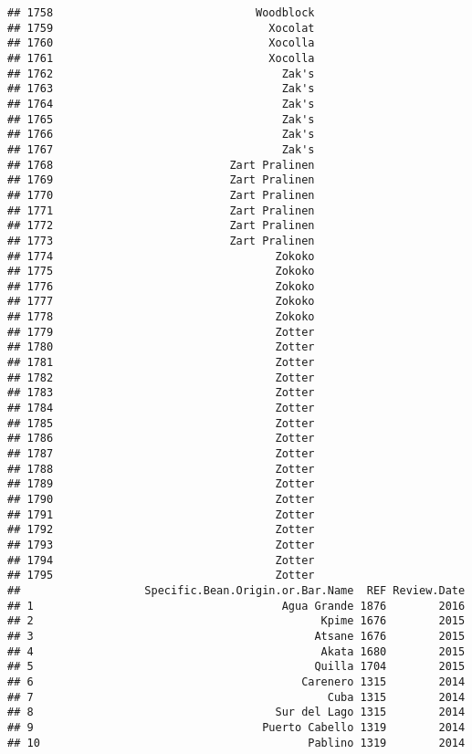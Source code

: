 \documentclass[
]{article}
\begin{document}
\begin{verbatim}
## 1758                               Woodblock
## 1759                                 Xocolat
## 1760                                 Xocolla
## 1761                                 Xocolla
## 1762                                   Zak's
## 1763                                   Zak's
## 1764                                   Zak's
## 1765                                   Zak's
## 1766                                   Zak's
## 1767                                   Zak's
## 1768                           Zart Pralinen
## 1769                           Zart Pralinen
## 1770                           Zart Pralinen
## 1771                           Zart Pralinen
## 1772                           Zart Pralinen
## 1773                           Zart Pralinen
## 1774                                  Zokoko
## 1775                                  Zokoko
## 1776                                  Zokoko
## 1777                                  Zokoko
## 1778                                  Zokoko
## 1779                                  Zotter
## 1780                                  Zotter
## 1781                                  Zotter
## 1782                                  Zotter
## 1783                                  Zotter
## 1784                                  Zotter
## 1785                                  Zotter
## 1786                                  Zotter
## 1787                                  Zotter
## 1788                                  Zotter
## 1789                                  Zotter
## 1790                                  Zotter
## 1791                                  Zotter
## 1792                                  Zotter
## 1793                                  Zotter
## 1794                                  Zotter
## 1795                                  Zotter
##                   Specific.Bean.Origin.or.Bar.Name  REF Review.Date
## 1                                      Agua Grande 1876        2016
## 2                                            Kpime 1676        2015
## 3                                           Atsane 1676        2015
## 4                                            Akata 1680        2015
## 5                                           Quilla 1704        2015
## 6                                         Carenero 1315        2014
## 7                                             Cuba 1315        2014
## 8                                     Sur del Lago 1315        2014
## 9                                   Puerto Cabello 1319        2014
## 10                                         Pablino 1319        2014

\end{verbatim}
\end{document}
